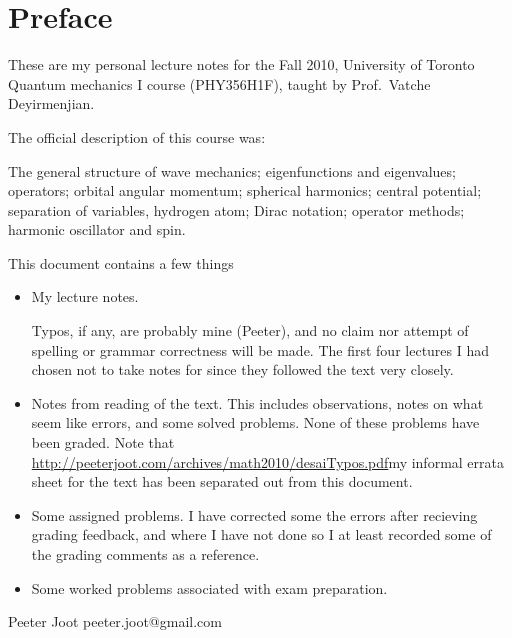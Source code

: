%
%

% 
% 
\chapter*{Preface}%

These are my personal lecture notes for the Fall 2010, University of Toronto Quantum mechanics I course (PHY356H1F), taught by Prof.\ Vatche Deyirmenjian.

The official description of this course was:

The general structure of wave mechanics; eigenfunctions and eigenvalues; operators; orbital angular momentum; spherical harmonics; central potential; separation of variables, hydrogen atom; Dirac notation; operator methods; harmonic oscillator and spin.

This document contains a few things

\begin{itemize}
\item My lecture notes.

Typos, if any, are probably mine (Peeter), and no claim nor attempt of spelling or grammar correctness will be made.  The first four lectures I had chosen not to take notes for since they followed the text \citep{desai2009quantum} very closely.

\item Notes from reading of the text.  This includes observations, notes on what seem like errors, and some solved problems.  None of these problems have been graded.  Note that \url{http://peeterjoot.com/archives/math2010/desaiTypos.pdf}{my informal errata sheet} for the text has been separated out from this document.

\item Some assigned problems.  I have corrected some the errors after recieving grading feedback, and where I have not done so I at least recorded some of the grading comments as a reference.

\item Some worked problems associated with exam preparation.

\end{itemize}

Peeter Joot  \quad peeter.joot@gmail.com 
